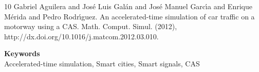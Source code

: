\documentclass[a4paper]{article} %
\def\keywords#1{\begin{center}{\bf Keywords}\\{#1}\end{center}} %
\begin{document}

\begin{thebibliography}{10}
{\sc Gabriel Aguilera and Jos\'e Luis Gal\'an and Jos\'e Manuel Garc\'{\i}a and Enrique M\'erida and Pedro Rodr\'{\i}guez}. {An accelerated-time simulation of car traffic on a motorway using a CAS}. Math. Comput. Simul. (2012), http://dx.doi.org/10.1016/j.matcom.2012.03.010.
\end{thebibliography}


\keywords{Accelerated-time simulation, Smart cities, Smart signals, CAS} %






\end{document}
